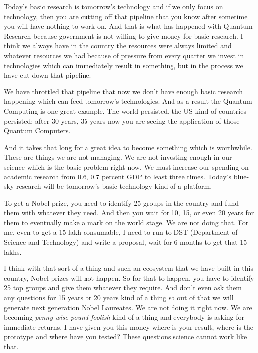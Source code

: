 Today’s basic research is tomorrow’s technology and if we only focus on technology, then you are cutting off that pipeline that you know after sometime you will have nothing to work on. And that is what has happened with Quantum Research because government is not willing to give money for basic research. I think we always have in the country the resources were always limited and whatever resources we had because of pressure from every quarter we invest in technologies which can immediately result in something, but in the process we have cut down that pipeline.

We have throttled that pipeline that now we don’t have enough basic research happening which can feed tomorrow’s technologies. And as a result the Quantum Computing is one great example. The world persisted, the US kind of countries persisted; after 30 years, 35 years now you are seeing the application of those Quantum Computers.

And it takes that long for a great idea to become something which is worthwhile. These are things we are not managing. We are not investing enough in our science which is the basic problem right now. We must increase our spending on academic research from 0.6, 0.7 percent GDP to least three times. Today’s blue-sky research will be tomorrow’s basic technology kind of a platform.

To get a Nobel prize, you need to identify 25 groups in the country and fund them with whatever they need. And then you wait for 10, 15, or even 20 years for them to eventually make a mark on the world stage. We are not doing that. For me, even to get a 15 lakh consumable, I need to run to DST (Department of Science and Technology) and write a proposal, wait for 6 months to get that 15 lakhs.

I think with that sort of a thing and such an ecosystem that we have built in this country, Nobel prizes will not happen. So for that to happen, you have to identify 25 top groups and give them whatever they require. And don’t even ask them any questions for 15 years or 20 years kind of a thing so out of that we will generate next generation Nobel Laureates. We are not doing it right now. We are becoming \textit{penny-wise pound-foolish} kind of a thing and everybody is asking for immediate returns. I have given you this money where is your result, where is the prototype and where have you tested? These questions science cannot work like that. 
